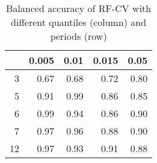 \begin{table}[ht]
\centering
\begin{tabular}{rrrrr}
  \hline
 & 0.005 & 0.01 & 0.015 & 0.05 \\ 
  \hline
3 & 0.67 & 0.68 & 0.72 & 0.80 \\ 
  5 & 0.91 & 0.99 & 0.86 & 0.85 \\ 
  6 & 0.99 & 0.94 & 0.86 & 0.90 \\ 
  7 & 0.97 & 0.96 & 0.88 & 0.90 \\ 
  12 & 0.97 & 0.93 & 0.91 & 0.88 \\ 
   \hline
\end{tabular}
\caption{Balanced accuracy of RF-CV with different quantiles (column) and periods (row)} 
\label{tab:rob}
\end{table}
